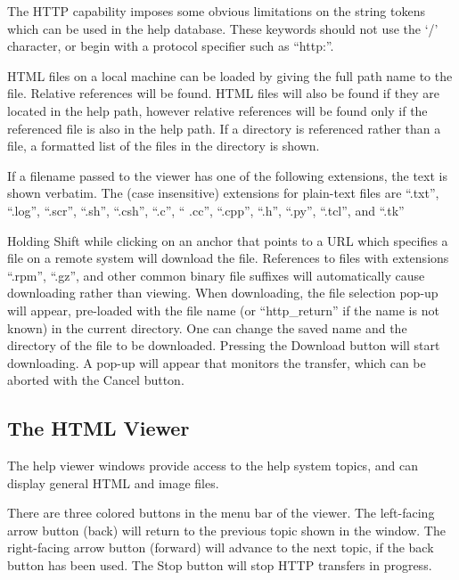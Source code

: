 The HTTP capability imposes some obvious limitations on the string
tokens which can be used in the help database.  These keywords should
not use the `/' character, or begin with a protocol specifier such as
``{\vt http:}''.

HTML files on a local machine can be loaded by giving the full path
name to the file.  Relative references will be found.  HTML files will
also be found if they are located in the help path, however relative
references will be found only if the referenced file is also in the
help path.  If a directory is referenced rather than a file, a
formatted list of the files in the directory is shown.

If a filename passed to the viewer has one of the following
extensions, the text is shown verbatim.  The (case insensitive)
extensions for plain-text files are ``{\vt .txt}'', ``{\vt .log}'',
``{\vt .scr}'', ``{\vt .sh}'', ``{\vt .csh}'', ``{\vt .c}'', ``{\vt
.cc}'', ``{\vt .cpp}'', ``{\vt .h}'', ``{\vt .py}'', ``{\vt .tcl}'',
and ``{\vt .tk}''

Holding {\kb Shift} while clicking on an anchor that points to a URL
which specifies a file on a remote system will download the file. 
References to files with extensions ``{\vt .rpm}'', ``{\vt .gz}'', and
other common binary file suffixes will automatically cause downloading
rather than viewing.  When downloading, the file selection pop-up will
appear, pre-loaded with the file name (or ``{\vt http\_return}'' if
the name is not known) in the current directory.  One can change the
saved name and the directory of the file to be downloaded.  Pressing
the {\cb Download} button will start downloading.  A pop-up will
appear that monitors the transfer, which can be aborted with the {\cb
Cancel} button.

\subsection{The HTML Viewer}
\label{helpview}

The help viewer windows provide access to the help system topics, and
can display general HTML and image files.

There are three colored buttons in the menu bar of the viewer.  The
left-facing arrow button (back) will return to the previous topic
shown in the window.  The right-facing arrow button (forward) will
advance to the next topic, if the back button has been used.  The {\cb
Stop} button will stop HTTP transfers in progress.


